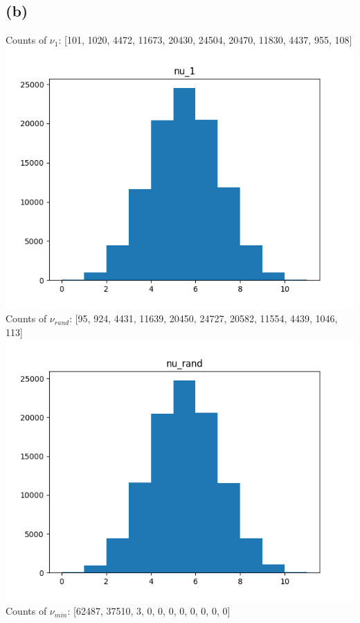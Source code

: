\documentclass{article}
\begin{document}
	\subsection*{(b)}
		Counts of $\nu_1$: [101, 1020, 4472, 11673, 20430, 24504, 20470, 11830, 4437, 955, 108]\\
		\includegraphics[scale=0.8]{nu_1.png}\\
		Counts of $\nu_{rand}$: [95, 924, 4431, 11639, 20450, 24727, 20582, 11554, 4439, 1046, 113]\\
		\includegraphics[scale=0.8]{nu_rand.png}\\
		Counts of $\nu_{min}$: [62487, 37510, 3, 0, 0, 0, 0, 0, 0, 0, 0]\\
\end{document}

